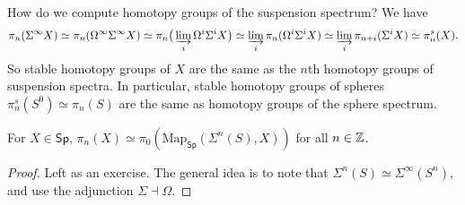 \begin{example}
    How do we compute homotopy groups of the suspension spectrum? We have
    \[
        \pi_n (\Sigma ^{\infty}X)  \simeq \pi _n (\Omega ^{\infty}\Sigma ^{\infty}X)\simeq \pi_n \big( \varinjlim _i \Omega ^i  \Sigma ^i  X\big) \simeq \varinjlim _i  \pi_n  (\Omega ^i  \Sigma ^i  X) \simeq  \varinjlim _i  \pi _{n+i}(\Sigma ^i  X) \simeq  \pi _n ^s (X).
    \] So stable homotopy groups of $X$ are the same as the $n$th homotopy groups of suspension spectra. In particular, stable homotopy groups of spheres $\pi _n ^s (S^0) \simeq \pi _n (S)$ are the same as homotopy groups of the sphere spectrum.
\end{example}
\begin{claim}
    For $X \in \mathsf{Sp} $, $\pi _n (X) \simeq \pi_0 (\mathrm{Map}_{\mathsf{Sp} }(\Sigma^n (S ),X))$ for all $n \in \mathbb{Z}$.
\end{claim}
\begin{proof}
    Left as an exercise. The general idea is to note that $\Sigma ^n  (S) \simeq  \Sigma ^{\infty}(S^n )$, and use the adjunction $\Sigma \dashv \Omega$.
\end{proof}

